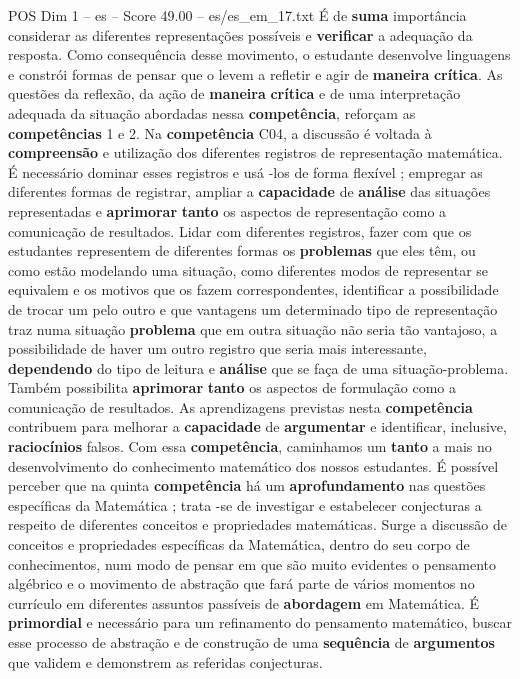 \begin{textsample}{POS Dim 1 – es – Score 49.00 – es/es\_em\_17.txt}
É de \textbf{suma} importância considerar as diferentes representações possíveis e \textbf{verificar} a adequação da resposta.
Como consequência desse movimento, o estudante desenvolve linguagens e constrói formas de pensar que o levem a refletir e agir de \textbf{maneira} \textbf{crítica}.
As questões da reflexão, da ação de \textbf{maneira} \textbf{crítica} e de uma interpretação adequada da situação abordadas nessa \textbf{competência}, reforçam as \textbf{competências} 1 e 2.
Na \textbf{competência} C04, a discussão é voltada à \textbf{compreensão} e utilização dos diferentes registros de representação matemática.
É necessário dominar esses registros e usá -los de forma flexível ; empregar as diferentes formas de registrar, ampliar a \textbf{capacidade} de \textbf{análise} das situações representadas e \textbf{aprimorar} \textbf{tanto} os aspectos de representação como a comunicação de resultados.
Lidar com diferentes registros, fazer com que os estudantes representem de diferentes formas os \textbf{problemas} que eles têm, ou como estão modelando uma situação, como diferentes modos de representar se equivalem e os motivos que os fazem correspondentes, identificar a possibilidade de trocar um pelo outro e que vantagens um determinado tipo de representação traz numa situação \textbf{problema} que em outra situação não seria tão vantajoso, a possibilidade de haver um outro registro que seria mais interessante, \textbf{dependendo} do tipo de leitura e \textbf{análise} que se faça de uma situação-problema.
Também possibilita \textbf{aprimorar} \textbf{tanto} os aspectos de formulação como a comunicação de resultados.
As aprendizagens previstas nesta \textbf{competência} contribuem para melhorar a \textbf{capacidade} de \textbf{argumentar} e identificar, inclusive, \textbf{raciocínios} falsos.
Com essa \textbf{competência}, caminhamos um \textbf{tanto} a mais no desenvolvimento do conhecimento matemático dos nossos estudantes.
É possível perceber que na quinta \textbf{competência} há um \textbf{aprofundamento} nas questões específicas da Matemática ; trata -se de investigar e estabelecer conjecturas a respeito de diferentes conceitos e propriedades matemáticas.
Surge a discussão de conceitos e propriedades específicas da Matemática, dentro do seu corpo de conhecimentos, num modo de pensar em que são muito evidentes o pensamento algébrico e o movimento de abstração que fará parte de vários momentos no currículo em diferentes assuntos passíveis de \textbf{abordagem} em Matemática.
É \textbf{primordial} e necessário para um refinamento do pensamento matemático, buscar esse processo de abstração e de construção de uma \textbf{sequência} de \textbf{argumentos} que validem e demonstrem as referidas conjecturas.

\end{textsample}
